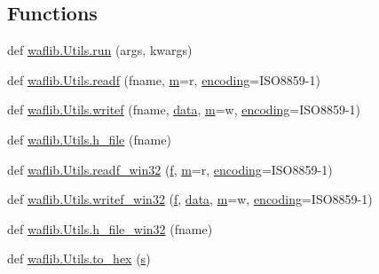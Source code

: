 \subsection*{Functions}
\begin{DoxyCompactItemize}
\item 
def \hyperlink{namespacewaflib_1_1_utils_ada79e8c638bdd6c9c204f18498a20a63}{waflib.\+Utils.\+run} (args, kwargs)
\item 
def \hyperlink{namespacewaflib_1_1_utils_a16a319ee31916b25b8e03072430b7535}{waflib.\+Utils.\+readf} (fname, \hyperlink{layer3_8c_a4b8bfe70f28d6faddcb10d6ecf8c1989}{m}=\textquotesingle{}r\textquotesingle{}, \hyperlink{structencoding}{encoding}=\textquotesingle{}I\+S\+O8859-\/1\textquotesingle{})
\item 
def \hyperlink{namespacewaflib_1_1_utils_a9848332212684c408d95507d15fecd18}{waflib.\+Utils.\+writef} (fname, \hyperlink{lib_2expat_8h_ac39e72a1de1cb50dbdc54b08d0432a24}{data}, \hyperlink{layer3_8c_a4b8bfe70f28d6faddcb10d6ecf8c1989}{m}=\textquotesingle{}w\textquotesingle{}, \hyperlink{structencoding}{encoding}=\textquotesingle{}I\+S\+O8859-\/1\textquotesingle{})
\item 
def \hyperlink{namespacewaflib_1_1_utils_a47890c712be0f352eb1ac19d42785e36}{waflib.\+Utils.\+h\+\_\+file} (fname)
\item 
def \hyperlink{namespacewaflib_1_1_utils_ab1410cfe233104ff8ec8f6c1e09e94d7}{waflib.\+Utils.\+readf\+\_\+win32} (\hyperlink{checksum_8c_ae747d72a1a803f5ff4a4b2602857d93b}{f}, \hyperlink{layer3_8c_a4b8bfe70f28d6faddcb10d6ecf8c1989}{m}=\textquotesingle{}r\textquotesingle{}, \hyperlink{structencoding}{encoding}=\textquotesingle{}I\+S\+O8859-\/1\textquotesingle{})
\item 
def \hyperlink{namespacewaflib_1_1_utils_a92e436e191f6bdee42e2efe8d38b9614}{waflib.\+Utils.\+writef\+\_\+win32} (\hyperlink{checksum_8c_ae747d72a1a803f5ff4a4b2602857d93b}{f}, \hyperlink{lib_2expat_8h_ac39e72a1de1cb50dbdc54b08d0432a24}{data}, \hyperlink{layer3_8c_a4b8bfe70f28d6faddcb10d6ecf8c1989}{m}=\textquotesingle{}w\textquotesingle{}, \hyperlink{structencoding}{encoding}=\textquotesingle{}I\+S\+O8859-\/1\textquotesingle{})
\item 
def \hyperlink{namespacewaflib_1_1_utils_a132df823d6f99f8f1da4208d1014dd4f}{waflib.\+Utils.\+h\+\_\+file\+\_\+win32} (fname)
\item 
def \hyperlink{namespacewaflib_1_1_utils_aa9057390bd85e0d7085ef4918559878d}{waflib.\+Utils.\+to\+\_\+hex} (\hyperlink{lib_2expat_8h_a755339d27872b13735c2cab829e47157}{s})

\end{DoxyCompactItemize}
